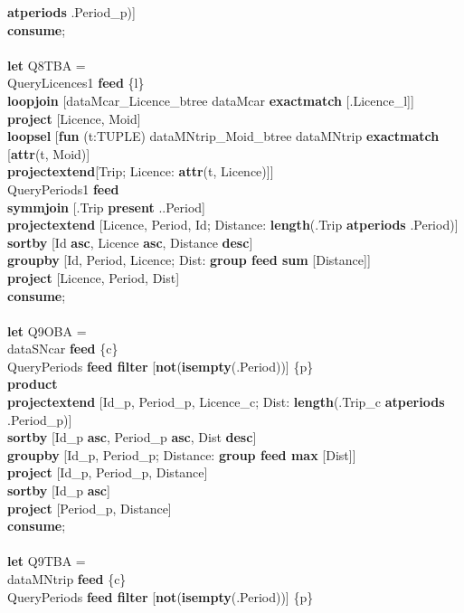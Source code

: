 \documentclass[a4paper]{article}
\newcommand{\op}[1]{\textbf{#1}}
\begin{document}
\begin{scriptsize}
\begin{tabbing}
\op{atperiods} .Period\_p)]\\
\op{consume};\\
\\
\op{let} Q8TBA =\\
\>QueryLicences1 \op{feed} \{l\}\\
\>\>\op{loopjoin} [dataMcar\_Licence\_btree dataMcar \op{exactmatch} [.Licence\_l]]\\
\>\>\op{project} [Licence, Moid]\\
\>\>\op{loopsel} [\op{fun} (t:TUPLE) dataMNtrip\_Moid\_btree dataMNtrip \op{exactmatch} [\op{attr}(t, Moid)]\\
\>\>\>\op{projectextend}[Trip; Licence: \op{attr}(t, Licence)]]\\
\>QueryPeriods1 \op{feed}\\
\>\op{symmjoin} [.Trip \op{present} ..Period]\\
\>\op{projectextend} [Licence, Period, Id; Distance: \op{length}(.Trip \op{atperiods} .Period)]\\
\>\op{sortby} [Id \op{asc}, Licence \op{asc}, Distance \op{desc}]\\
\>\op{groupby} [Id, Period, Licence; Dist: \op{group feed sum} [Distance]]\\
\>\op{project} [Licence, Period, Dist]\\
\op{consume};\\
\\
\op{let} Q9OBA =\\
\>dataSNcar \op{feed} \{c\}\\
\>QueryPeriods \op{feed filter} [\op{not}(\op{isempty}(.Period))] \{p\}\\
\>\op{product}\\
\>\op{projectextend} [Id\_p, Period\_p, Licence\_c; Dist: \op{length}(.Trip\_c \op{atperiods} .Period\_p)]\\
\>\op{sortby} [Id\_p \op{asc}, Period\_p \op{asc}, Dist \op{desc}]\\
\>\op{groupby} [Id\_p, Period\_p; Distance: \op{group feed max} [Dist]]\\
\>\op{project} [Id\_p, Period\_p, Distance]\\
\>\op{sortby} [Id\_p \op{asc}]\\
\>\op{project} [Period\_p, Distance]\\
\op{consume};\\
\\
\op{let} Q9TBA =\\
\>dataMNtrip \op{feed} \{c\}\\
\>QueryPeriods \op{feed filter} [\op{not}(\op{isempty}(.Period))] \{p\}\\

\end{tabbing}
\end{scriptsize}
\end{document}
